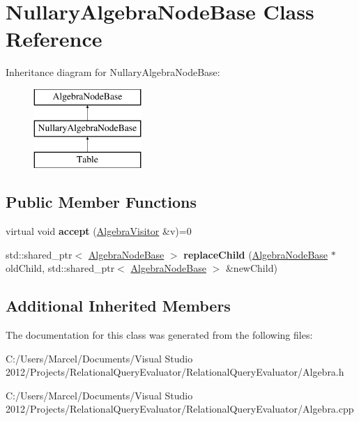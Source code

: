 \hypertarget{class_nullary_algebra_node_base}{\section{Nullary\+Algebra\+Node\+Base Class Reference}
\label{class_nullary_algebra_node_base}
}
Inheritance diagram for Nullary\+Algebra\+Node\+Base\+:\begin{figure}[H]
\begin{center}
\leavevmode
\includegraphics[height=3.000000cm]{class_nullary_algebra_node_base}
\end{center}
\end{figure}
\subsection*{Public Member Functions}
\begin{DoxyCompactItemize}
\item 
\hypertarget{class_nullary_algebra_node_base_a48446f68e1ddfc2357dcd048fd82ba80}{virtual void {\bfseries accept} (\hyperlink{class_algebra_visitor}{Algebra\+Visitor} \&v)=0}\label{class_nullary_algebra_node_base_a48446f68e1ddfc2357dcd048fd82ba80}

\item 
\hypertarget{class_nullary_algebra_node_base_af5a5e7f02db8509605ab852ef65b201b}{std\+::shared\+\_\+ptr$<$ \hyperlink{class_algebra_node_base}{Algebra\+Node\+Base} $>$ {\bfseries replace\+Child} (\hyperlink{class_algebra_node_base}{Algebra\+Node\+Base} $\ast$old\+Child, std\+::shared\+\_\+ptr$<$ \hyperlink{class_algebra_node_base}{Algebra\+Node\+Base} $>$ \&new\+Child)}\label{class_nullary_algebra_node_base_af5a5e7f02db8509605ab852ef65b201b}

\end{DoxyCompactItemize}
\subsection*{Additional Inherited Members}


The documentation for this class was generated from the following files\+:\begin{DoxyCompactItemize}
\item 
C\+:/\+Users/\+Marcel/\+Documents/\+Visual Studio 2012/\+Projects/\+Relational\+Query\+Evaluator/\+Relational\+Query\+Evaluator/Algebra.\+h\item 
C\+:/\+Users/\+Marcel/\+Documents/\+Visual Studio 2012/\+Projects/\+Relational\+Query\+Evaluator/\+Relational\+Query\+Evaluator/Algebra.\+cpp\end{DoxyCompactItemize}
